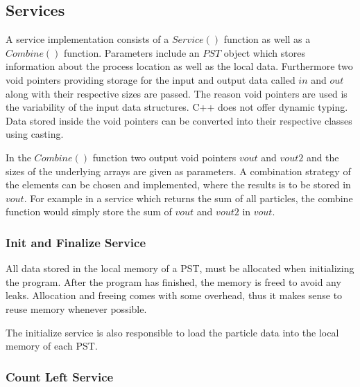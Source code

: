 \documentclass[]{article}
\begin{document}
\subsection{Services}\label{services}

A service implementation consists of a $Service()$ function as well as a $Combine()$ function. Parameters include an $PST$ object which stores information about the process location as well as the local data. Furthermore two void pointers providing storage for the input and output data called $in$ and $out$ along with their respective sizes are passed. The reason void pointers are used is the variability of the input data structures. C++ does not offer dynamic typing. Data stored inside the void pointers can be converted into their respective classes using casting. 

In the $Combine()$ function two output void pointers $vout$ and $vout2$ and the sizes of the underlying arrays are given as parameters. A combination strategy of the elements can be chosen and implemented, where the results is to be stored in $vout$. For example in a service which returns the sum of all particles, the combine function would simply store the sum of $vout$ and $vout2$ in $vout$.

\subsubsection{Init and Finalize Service}

All data stored in the local memory of a PST, must be allocated when initializing the program. After the program has finished, the memory is freed to avoid any leaks. Allocation and freeing comes with some overhead, thus it makes sense to reuse memory whenever possible. 

The initialize service is also responsible to load the particle data into the local memory of each PST. 

\subsubsection{Count Left Service}
\end{document}
